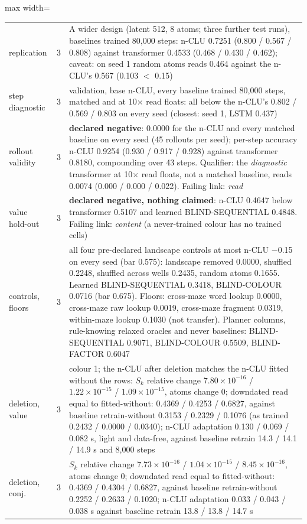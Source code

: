 \documentclass{article} %
\newcommand{\sci}[2]{\ensuremath{#1\times10^{#2}}}
\begin{document}
\begin{table}[h]
\begin{adjustbox}{max width=\linewidth}
\begin{tabular}{p{1.9cm}p{1.2cm}p{10.0cm}}
\quad replication & 3 & A wider design (latent 512, 8 atoms; three further test runs), baselines trained 80,000 steps: n-CLU 0.7251 (0.800 / 0.567 / 0.808) against transformer 0.4533 (0.468 / 0.430 / 0.462); caveat: on seed 1 random atoms reads 0.464 against the n-CLU's 0.567 (0.103 $<$ 0.15) \\ %
\quad step diagnostic & 3 & validation, base n-CLU, every baseline trained 80,000 steps, matched and at 10$\times$ read floats: all below the n-CLU's 0.802 / 0.569 / 0.803 on every seed (closest: seed 1, LSTM 0.437) \\
rollout validity & 3 & \textbf{declared negative}: 0.0000 for the n-CLU and every matched baseline on every seed (45 rollouts per seed); per-step accuracy n-CLU 0.9254 (0.930 / 0.917 / 0.928) against transformer 0.8180, compounding over 43 steps. Qualifier: the \emph{diagnostic} transformer at 10$\times$ read floats, not a matched baseline, reads 0.0074 (0.000 / 0.000 / 0.022). Failing link: \emph{read} \\
value hold-out & 3 & \textbf{declared negative, nothing claimed}: n-CLU 0.4647 below transformer 0.5107 and learned BLIND-SEQUENTIAL 0.4848. Failing link: \emph{content} (a never-trained colour has no trained cells) \\
controls, floors & 3 & all four pre-declared landscape controls at most n-CLU $-$0.15 on every seed (bar 0.575): landscape removed 0.0000, shuffled 0.2248, shuffled across wells 0.2435, random atoms 0.1655. Learned BLIND-SEQUENTIAL 0.3418, BLIND-COLOUR 0.0716 (bar 0.675). Floors: cross-maze word lookup 0.0000, cross-maze raw lookup 0.0019, cross-maze fragment 0.0319, within-maze lookup 0.1030 (not transfer). Planner columns, rule-knowing relaxed oracles and never baselines: BLIND-SEQUENTIAL 0.9071, BLIND-COLOUR 0.5509, BLIND-FACTOR 0.6047 \\
deletion, value & 3 & colour 1; the n-CLU after deletion matches the n-CLU fitted without the rows: $S_k$ relative change \sci{7.80}{-16} / \sci{1.22}{-15} / \sci{1.09}{-15}, atoms change 0; downdated read equal to fitted-without: 0.4369 / 0.4253 / 0.6827, against baseline retrain-without 0.3153 / 0.2329 / 0.1076 (as trained 0.2432 / 0.0000 / 0.0340); n-CLU adaptation 0.130 / 0.069 / 0.082 s, light and data-free, against baseline retrain 14.3 / 14.1 / 14.9 s and 8,000 steps \\
deletion, conj. & 3 & $S_k$ relative change \sci{7.73}{-16} / \sci{1.04}{-15} / \sci{8.45}{-16}, atoms change 0; downdated read equal to fitted-without: 0.4369 / 0.4304 / 0.6827, against baseline retrain-without 0.2252 / 0.2633 / 0.1020; n-CLU adaptation 0.033 / 0.043 / 0.038 s against baseline retrain 13.8 / 13.8 / 14.7 s \\

\end{tabular}
\end{adjustbox}
\end{table}
\end{document}
